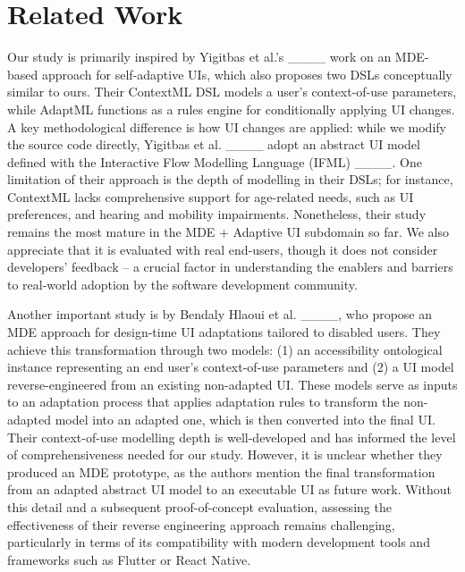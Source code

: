 \section{Related Work}
\label{related work}


Our study is primarily inspired by Yigitbas et al.’s ____ work on an MDE-based approach for self-adaptive UIs, which also proposes two DSLs conceptually similar to ours. Their ContextML DSL models a user's context-of-use parameters, while AdaptML functions as a rules engine for conditionally applying UI changes. A key methodological difference is how UI changes are applied: while we modify the source code directly, Yigitbas et al. ____ adopt an abstract UI model defined with the Interactive Flow Modelling Language (IFML) ____. One limitation of their approach is the depth of modelling in their DSLs; for instance, ContextML lacks comprehensive support for age-related needs, such as UI preferences, and hearing and mobility impairments. Nonetheless, their study remains the most mature in the MDE + Adaptive UI subdomain so far. We also appreciate that it is evaluated with real end-users, though it does not consider developers' feedback -- a crucial factor in understanding the enablers and barriers to real-world adoption by the software development community.

Another important study is by Bendaly Hlaoui et al. ____, who propose an MDE approach for design-time UI adaptations tailored to disabled users. They achieve this transformation through two models: (1) an accessibility ontological instance representing an end user's context-of-use parameters and (2) a UI model reverse-engineered from an existing non-adapted UI. These models serve as inputs to an adaptation process that applies adaptation rules to transform the non-adapted model into an adapted one, which is then converted into the final UI. Their context-of-use modelling depth is well-developed and has informed the level of comprehensiveness needed for our study. However, it is unclear whether they produced an MDE prototype, as the authors mention the final transformation from an adapted abstract UI model to an executable UI as future work. Without this detail and a subsequent proof-of-concept evaluation, assessing the effectiveness of their reverse engineering approach remains challenging, particularly in terms of its compatibility with modern development tools and frameworks such as Flutter or React Native.

